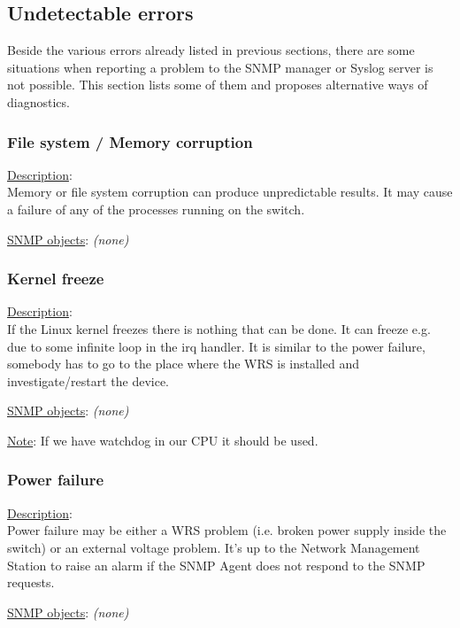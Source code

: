 \newpage
\subsection{Undetectable errors}

Beside the various errors already listed in previous sections, there are some
situations when reporting a problem to the SNMP manager or Syslog server is not
possible. This section lists some of them and proposes alternative ways of
diagnostics.

\subsubsection{\bf File system / Memory corruption}
		\label{fail:other:memory}
		\begin{pck_descr}
			\item [] \underline{Description}:\\
        Memory or file system corruption can produce unpredictable results. It
        may cause a failure of any of the processes running on the switch.
			\item [] \underline{SNMP objects}: \emph{(none)}
		\end{pck_descr}

\subsubsection{\bf Kernel freeze}
		\begin{pck_descr}
			\item [] \underline{Description}:\\
				If the Linux kernel freezes there is nothing that can be done. It can
        freeze e.g. due to some infinite loop in the irq handler. It is similar
        to the power failure, somebody has to go to the place where the WRS is
        installed and investigate/restart the device.
			\item [] \underline{SNMP objects}: \emph{(none)}
			\item [] \underline{Note}:
				If we have watchdog in our CPU it should be used.
		\end{pck_descr}

\subsubsection{\bf Power failure}
		\begin{pck_descr}
			\item [] \underline{Description}:\\
				Power failure may be either a WRS problem (i.e. broken power supply
				inside the switch) or an external voltage problem. It's up to the
        Network Management Station to raise an alarm if the SNMP Agent does
				not respond to the SNMP requests.
			\item [] \underline{SNMP objects}: \emph{(none)}
		\end{pck_descr}

